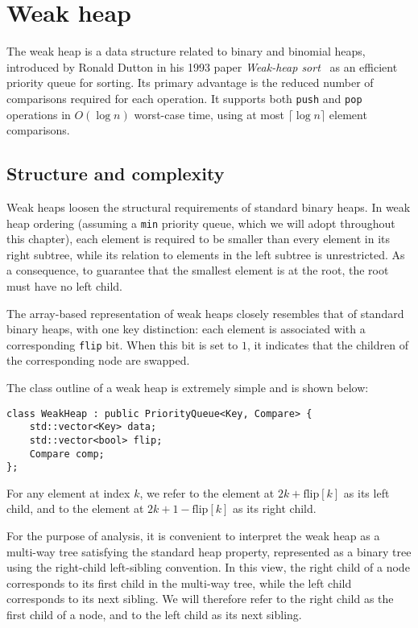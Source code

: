 \section{Weak heap}

The weak heap is a data structure related to binary and binomial heaps, introduced by Ronald Dutton in his 1993 paper \emph{Weak-heap sort}~\cite{Dutton1993} as an efficient priority queue for
sorting. Its primary advantage is the reduced number of comparisons required for each operation. It supports both \texttt{push} and \texttt{pop} operations in \( O(\log n) \) worst-case time, using at most \( \lceil \log n \rceil \) element comparisons.

\subsection{Structure and complexity}

Weak heaps loosen the structural requirements of standard binary heaps. In weak heap ordering (assuming a \texttt{min} priority queue, which we will adopt throughout this chapter), each element is required to be smaller than every element in its right subtree, while its relation to elements in the left subtree is unrestricted. As a consequence, to guarantee that the smallest element is at the root, the root must have no left child.

The array-based representation of weak heaps closely resembles that of standard binary heaps, with one key distinction: each element is associated with a corresponding \texttt{flip} bit. When this bit is set to \(1\), it indicates that the children of the corresponding node are swapped.

The class outline of a weak heap is extremely simple and is shown below:

\begin{verbatim}
class WeakHeap : public PriorityQueue<Key, Compare> {
    std::vector<Key> data;
    std::vector<bool> flip;
    Compare comp;
};
\end{verbatim}

For any element at index \(k\), we refer to the element at \(2k + \text{flip}[k]\) as its left child, and to the element at \(2k + 1 - \text{flip}[k]\) as its right child. 

For the purpose of analysis, it is convenient to interpret the weak heap as a multi-way tree satisfying the standard heap property, represented as a binary tree using the right-child left-sibling convention. In this view, the right child of a node corresponds to its first child in the multi-way tree, while the left child corresponds to its next sibling. We will therefore refer to the right child as the first child of a node, and to the left child as its next sibling.

